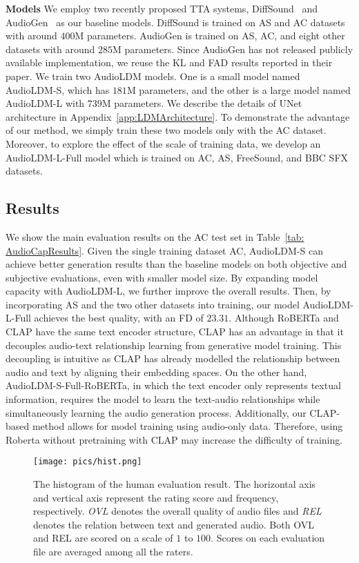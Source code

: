 \textbf{Models} We employ two recently proposed TTA systems, DiffSound~\cite{yang2022diffsound} and AudioGen~\cite{kreuk2022audiogen} as our baseline models. DiffSound is trained on AS and AC datasets with around $400$M parameters. AudioGen is trained on AS, AC, and eight other datasets with around $285$M parameters. Since AudioGen has not released publicly available implementation, we reuse the KL and FAD results reported in their paper. We train two AudioLDM models. One is a small model named AudioLDM-S, which has $181$M parameters, and the other is a large model named AudioLDM-L with $739$M parameters. We describe the details of UNet architecture in Appendix~\ref{app:LDMArchitecture}. To demonstrate the advantage of our method, we simply train these two models only with the AC dataset. Moreover, to explore the effect of the scale of training data, we develop an AudioLDM-L-Full model which is trained on AC, AS, FreeSound, and BBC SFX datasets. 

\subsection{Results}

We show the main evaluation results on the AC test set in Table~\ref{tab: AudioCapResults}. Given the single training dataset AC, AudioLDM-S can achieve better generation results than the baseline models on both objective and subjective evaluations, even with smaller model size. By expanding model capacity with AudioLDM-L, we further improve the overall results. Then, by incorporating AS and the two other datasets into training, our model AudioLDM-L-Full achieves the best quality, with an FD of $23.31$. 
Although RoBERTa and CLAP have the same text encoder structure, CLAP has an advantage in that it decouples audio-text relationship learning from generative model training. This decoupling is intuitive as CLAP has already modelled the relationship between audio and text by aligning their embedding spaces. On the other hand, AudioLDM-S-Full-RoBERTa, in which the text encoder only represents textual information, requires the model to learn the text-audio relationships while simultaneously learning the audio generation process. Additionally, our CLAP-based method allows for model training using audio-only data. Therefore, using Roberta without pretraining with CLAP may increase the difficulty of training.

\begin{figure*}[tbp]
    \centering
    \texttt{[image: pics/hist.png]}
    \caption{The histogram of the human evaluation result. The horizontal axis and vertical axis represent the rating score and frequency, respectively. \textit{OVL} denotes the overall quality of audio files and \textit{REL} denotes the relation between text and generated audio. Both OVL and REL are scored on a scale of $1$ to $100$. Scores on each evaluation file are averaged among all the raters.}
    \label{fig:hist-human-evaluation}
\end{figure*}

